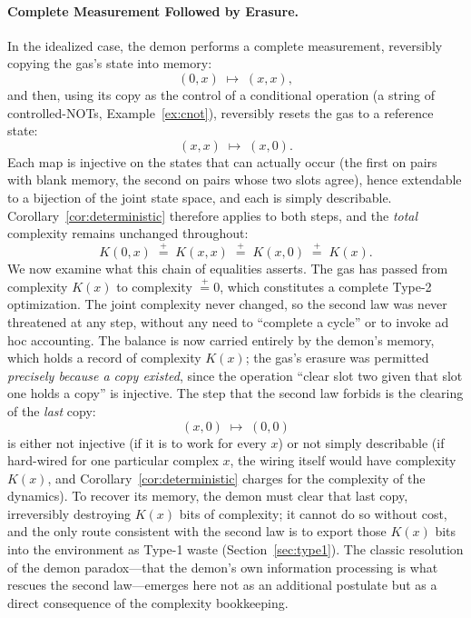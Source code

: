 \documentclass[10pt]{article}
\theoremstyle{definition}
\theoremstyle{remark}
\newcommand{\peq}{\mathrel{\stackrel{+}{=}}}
\begin{document}
\paragraph{Complete Measurement Followed by Erasure.} In the idealized case, the demon performs a complete measurement, reversibly copying the gas's state into memory:
\[
(0, x) \;\mapsto\; (x, x),
\]
and then, using its copy as the control of a conditional operation (a string of controlled-NOTs, Example~\ref{ex:cnot}), reversibly resets the gas to a reference state:
\[
(x, x) \;\mapsto\; (x, 0).
\]
Each map is injective on the states that can actually occur (the first on pairs with blank memory, the second on pairs whose two slots agree), hence extendable to a bijection of the joint state space, and each is simply describable. Corollary~\ref{cor:deterministic} therefore applies to both steps, and the \emph{total} complexity remains unchanged throughout:
\[
K(0, x) \;\peq\; K(x, x) \;\peq\; K(x, 0) \;\peq\; K(x).
\]
We now examine what this chain of equalities asserts. The gas has passed from complexity $K(x)$ to complexity $\peq 0$, which constitutes a complete Type-2 optimization. The joint complexity never changed, so the second law was never threatened at any step, without any need to ``complete a cycle'' or to invoke ad hoc accounting. The balance is now carried entirely by the demon's memory, which holds a record of complexity $K(x)$; the gas's erasure was permitted \emph{precisely because a copy existed}, since the operation ``clear slot two given that slot one holds a copy'' is injective. The step that the second law forbids is the clearing of the \emph{last} copy:
\[
(x, 0) \;\mapsto\; (0, 0)
\]
is either not injective (if it is to work for every $x$) or not simply describable (if hard-wired for one particular complex $x$, the wiring itself would have complexity $K(x)$, and Corollary~\ref{cor:deterministic} charges for the complexity of the dynamics). To recover its memory, the demon must clear that last copy, irreversibly destroying $K(x)$ bits of complexity; it cannot do so without cost, and the only route consistent with the second law is to export those $K(x)$ bits into the environment as Type-1 waste (Section~\ref{sec:type1}). The classic resolution of the demon paradox---that the demon's own information processing is what rescues the second law---emerges here not as an additional postulate but as a direct consequence of the complexity bookkeeping.
\end{document}
